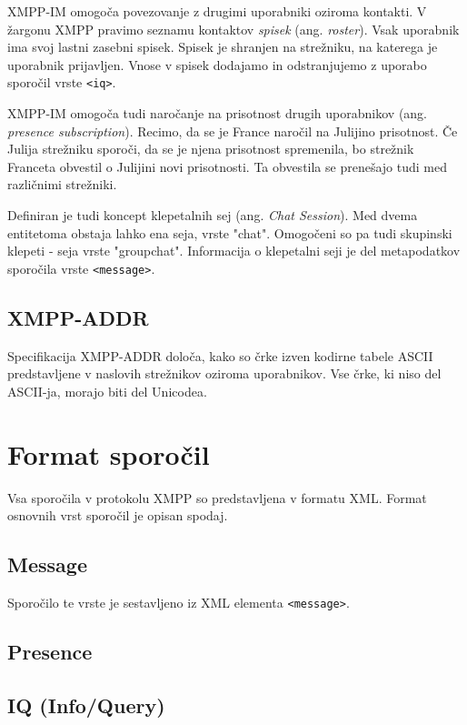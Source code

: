 \documentclass[11pt]{article}
\begin{document}
XMPP-IM omogoča povezovanje z drugimi uporabniki oziroma kontakti. V
žargonu XMPP pravimo seznamu kontaktov \emph{spisek} (ang. \emph{roster}). Vsak
uporabnik ima svoj lastni zasebni spisek. Spisek je shranjen na
strežniku, na katerega je uporabnik prijavljen. Vnose v spisek
dodajamo in odstranjujemo z uporabo sporočil vrste \texttt{<iq>}.

XMPP-IM omogoča tudi naročanje na prisotnost drugih uporabnikov
(ang. \emph{presence subscription}). Recimo, da se je France naročil na
Julijino prisotnost. Če Julija strežniku sporoči, da se je njena
prisotnost spremenila, bo strežnik Franceta obvestil o Julijini novi
prisotnosti. Ta obvestila se prenešajo tudi med različnimi strežniki.

Definiran je tudi koncept klepetalnih sej (ang. \emph{Chat
Session}). Med dvema entitetoma obstaja lahko ena seja, vrste
"chat". Omogočeni so pa tudi skupinski klepeti - seja vrste
"groupchat". Informacija o klepetalni seji je del metapodatkov
sporočila vrste \texttt{<message>}.

\subsection{XMPP-ADDR}
\label{sec:org5a7c784}

Specifikacija XMPP-ADDR določa, kako so črke izven kodirne tabele
ASCII predstavljene v naslovih strežnikov oziroma uporabnikov. Vse
črke, ki niso del ASCII-ja, morajo biti del Unicodea.

\section{Format sporočil}
\label{sec:org6a4447c}

Vsa sporočila v protokolu XMPP so predstavljena v formatu
XML. Format osnovnih vrst sporočil je opisan spodaj.

\subsection{Message}
\label{sec:orgcafadff}

Sporočilo te vrste je sestavljeno iz XML elementa \texttt{<message>}.

\subsection{Presence}
\label{sec:org5aa712e}

\subsection{IQ (Info/Query)}
\label{sec:orgda41e57}
\end{document}
